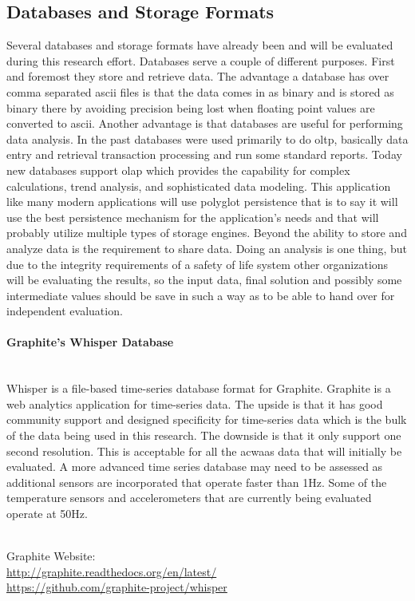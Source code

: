 \subsection{Databases and Storage Formats}
Several databases and storage formats have already been and will be evaluated during this research effort.  Databases serve a couple of different purposes. First and foremost they store and retrieve data.  The advantage a database has over comma separated \ac{ascii} files is that the data comes in as binary and is stored as binary there by avoiding precision being lost when floating point values are converted to \ac{ascii}.  Another advantage is that databases are useful for performing data analysis.  In the past databases were used primarily to do \ac{oltp}, basically data entry and retrieval transaction processing and run some standard reports. Today new databases support \ac{olap} which provides the capability for complex calculations, trend analysis, and sophisticated data modeling. This application like many modern applications will use polyglot persistence that is to say it will use the best persistence mechanism for the application's needs and that will probably utilize multiple types of storage engines. Beyond the ability to store and analyze data is the requirement to share data. Doing an analysis is one thing, but due to the integrity requirements of a safety of life system other organizations will be evaluating the results, so the input data, final solution and possibly some intermediate values should be save in such a way as to be able to hand over for independent evaluation.

\paragraph{Graphite's Whisper Database} ~\\
Whisper is a file-based time-series database format for Graphite. Graphite is a web analytics application for time-series data. The upside is that it has good community support and designed specificity for time-series data which is the bulk of the data being used in this research. The downside is that it only support one second resolution. This is acceptable for all the ac{waas} data that will initially be evaluated. A more advanced time series database may need to be assessed as additional sensors are incorporated that operate faster than 1Hz. Some of the temperature sensors and accelerometers that are currently being evaluated operate at 50Hz.

\noindent
\\Graphite Website:\\
\url{http://graphite.readthedocs.org/en/latest/}\\
\url{https://github.com/graphite-project/whisper}

